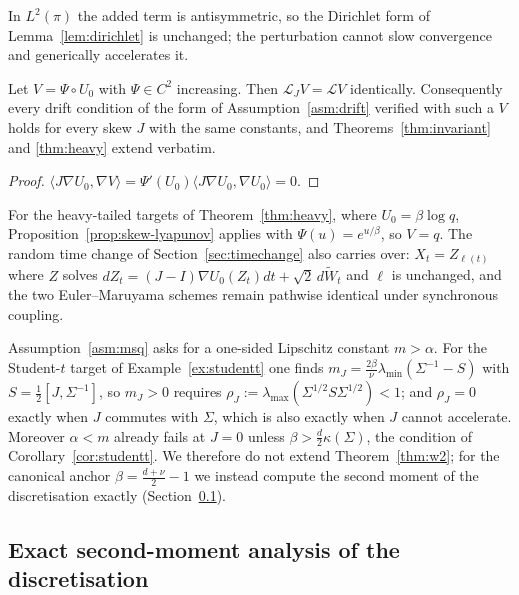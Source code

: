 In $L^2(\pi)$ the added term is antisymmetric, so the Dirichlet form of
Lemma~\ref{lem:dirichlet} is unchanged; the perturbation cannot slow
convergence and generically accelerates it.

\begin{proposition}\label{prop:skew-lyapunov}
Let $V=\Psi\circ U_0$ with $\Psi\in C^2$ increasing.  Then
$\mathcal L_JV=\mathcal LV$ identically.  Consequently every drift condition of
the form of Assumption~\ref{asm:drift} verified with such a $V$ holds for every
skew $J$ with the same constants, and Theorems~\ref{thm:invariant} and
\ref{thm:heavy} extend verbatim.
\end{proposition}

\begin{proof}
$\langle J\nabla U_0,\nabla V\rangle=\Psi'(U_0)\langle J\nabla U_0,\nabla U_0\rangle=0$.
\end{proof}

For the heavy-tailed targets of Theorem~\ref{thm:heavy}, where
$U_0=\beta\log q$, Proposition~\ref{prop:skew-lyapunov} applies with
$\Psi(u)=e^{u/\beta}$, so $V=q$.  The random time change of
Section~\ref{sec:timechange} also carries over: $X_t=Z_{\ell(t)}$ where $Z$
solves $dZ_t=(J-I)\nabla U_0(Z_t)dt+\sqrt2\,d\widetilde W_t$ and $\ell$ is
unchanged, and the two Euler--Maruyama schemes remain pathwise identical under
synchronous coupling.

\begin{remark}
Assumption~\ref{asm:msq} asks for a one-sided Lipschitz constant $m>\alpha$.
For the Student-$t$ target of Example~\ref{ex:studentt} one finds
$m_J=\tfrac{2\beta}{\nu}\lambda_{\min}(\Sigma^{-1}-S)$ with
$S=\tfrac12[J,\Sigma^{-1}]$, so $m_J>0$ requires
$\rho_J:=\lambda_{\max}(\Sigma^{1/2}S\Sigma^{1/2})<1$; and $\rho_J=0$ exactly
when $J$ commutes with $\Sigma$, which is also exactly when $J$ cannot
accelerate.  Moreover $\alpha<m$ already fails at $J=0$ unless
$\beta>\tfrac d2\kappa(\Sigma)$, the condition of
Corollary~\ref{cor:studentt}.  We therefore do not extend Theorem~\ref{thm:w2};
for the canonical anchor $\beta=\tfrac{d+\nu}{2}-1$ we instead compute the
second moment of the discretisation exactly (Section~\ref{sec:skew-msq}).
\end{remark}

\subsection{Exact second-moment analysis of the discretisation}
\label{sec:skew-msq}

